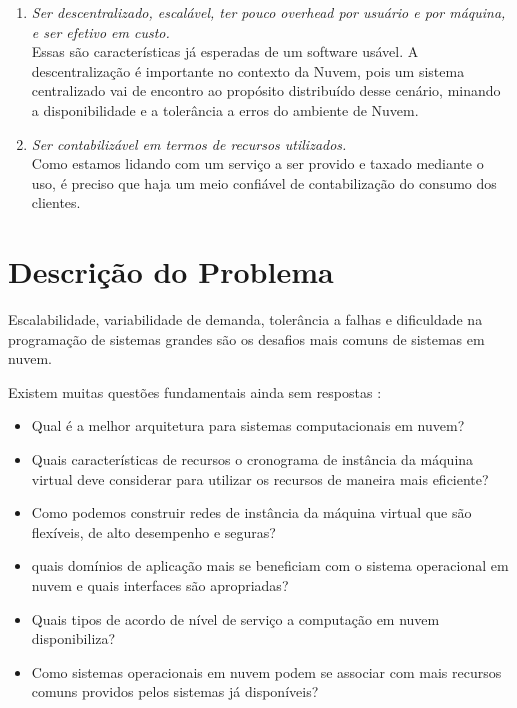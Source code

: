 \documentclass{llncs}
\begin{document}
\begin{enumerate}
\item \emph{Ser descentralizado, escalável, ter pouco overhead por usuário e por máquina, e ser efetivo em custo.} \\
Essas são características já esperadas de um software usável. A descentralização é importante no contexto da Nuvem, pois um sistema centralizado vai de encontro ao propósito distribuído desse cenário, minando a disponibilidade e a tolerância a erros do ambiente de Nuvem.\\

\item \emph{Ser contabilizável em termos de recursos utilizados.} \\
Como estamos lidando com um serviço a ser provido e taxado mediante o uso, é preciso que haja um meio confiável de contabilização do consumo dos clientes. \\

\end{enumerate}

\section{Descrição do Problema}
Escalabilidade, variabilidade de demanda, tolerância a falhas e dificuldade na programação de sistemas grandes são os desafios mais comuns de sistemas em nuvem.

Existem muitas questões fundamentais ainda sem respostas \cite{nurmi}: 
\begin{itemize}
\item Qual é a melhor arquitetura para sistemas computacionais em nuvem?
\item Quais características de recursos o cronograma de instância da máquina virtual deve considerar para utilizar os recursos de maneira mais eficiente?
\item Como podemos construir redes de instância da máquina virtual que são flexíveis, de alto desempenho e seguras? 
\item  quais domínios de aplicação mais se beneficiam com o sistema operacional em nuvem e quais interfaces são apropriadas? 
\item  Quais tipos de acordo de nível de serviço a computação em nuvem disponibiliza?
\item  Como sistemas operacionais em nuvem podem se associar com mais recursos comuns providos pelos sistemas já disponíveis?
\end{itemize}
\end{document}
